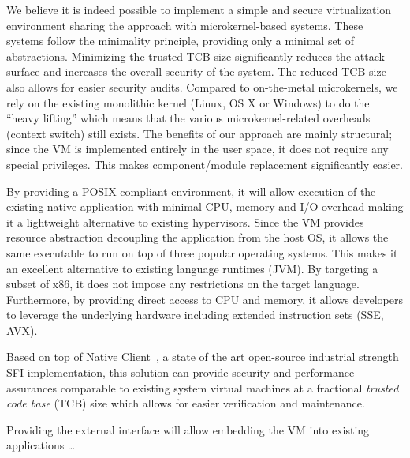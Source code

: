 We believe it is indeed possible to implement a simple and secure
virtualization environment sharing the approach with microkernel-based
systems. These systems follow the minimality principle, providing only
a minimal set of abstractions. Minimizing the trusted TCB size
significantly reduces the attack surface and increases the overall
security of the system. The reduced TCB size also allows for easier
security audits. Compared to on-the-metal microkernels, we rely on the
existing monolithic kernel (\ie Linux, OS X or Windows) to do the
``heavy lifting'' which means that the various microkernel-related
overheads (\eg context switch) still exists.   The benefits of our approach are mainly
structural; since the VM is implemented entirely in the user space, it
does not require any special privileges. This makes component/module
replacement significantly easier.

By providing a POSIX compliant environment, it will allow execution of
the existing native application with minimal CPU, memory and I/O
overhead making it a lightweight alternative to existing hypervisors.
Since the VM provides resource abstraction decoupling the application
from the host OS, it allows the same executable to run on top of three
popular operating systems. This makes it an excellent alternative to
existing language runtimes (\eg JVM). By targeting a subset of x86, it
does not impose any restrictions on the target language.  Furthermore,
by providing direct access to CPU and memory, it allows developers to
leverage the underlying hardware including extended instruction sets
(\eg SSE, AVX).


Based on top of Native Client~\cite{yee:ieee-sp09}, a state of the art
open-source industrial strength SFI implementation, this solution can
provide security and performance assurances comparable to existing
system virtual machines at a fractional \emph{trusted code base} (TCB)
size which allows for easier verification and maintenance. 

Providing the external interface will allow embedding
the VM into existing applications \ldots

